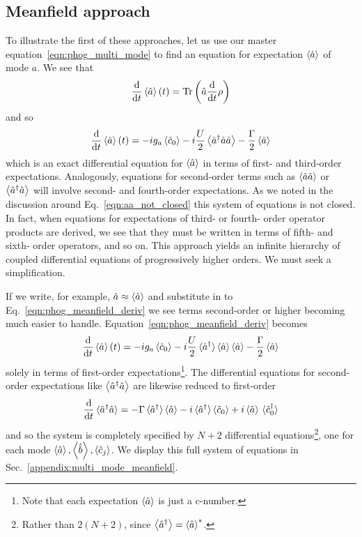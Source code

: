 \subsection{Meanfield approach}\label{sec:meanfield}
To illustrate the first of these approaches, let us use our master equation~\ref{eqn:phog_multi_mode} to find an equation for expectation $\ev{\hat{a}}$ of mode $a$. We see that
\begin{equation}
\ddt \ev{\hat{a}}\left(t\right) = \text{Tr}\left( \hat{a} \ddt \rho\right)
\end{equation}
and so
\begin{equation}\label{eqn:phog_meanfield_deriv}
\ddt \ev{\hat{a}}\left(t\right) = - i g_a \ev{\hat{c}_0} - i \frac{U}{2} \ev{\hat{a}^\dagger \hat{a}\hat{a}} - \frac{\Gamma}{2} \ev{\hat{a}}
\end{equation}
which is an exact differential equation for $\ev{\hat{a}}$ in terms of first- and third-order expectations. Analogously, equations for second-order terms such as $\ev{\hat{a}\hat{a}}$ or $\ev{\hat{a}^\dagger \hat{a}}$ will involve second- and fourth-order expectations. As we noted in the discussion around Eq.~\ref{eqn:aa_not_closed} this system of equations is not closed. In fact, when equations for expectations of third- or fourth- order operator products are derived, we see that they must be written in terms of fifth- and sixth- order operators, and so on. This approach yields an infinite hierarchy of coupled differential equations of progressively higher orders. We must seek a simplification.

If we write, for example, $\hat{a} \approx \ev{\hat{a}}$ and substitute in to Eq.~\ref{eqn:phog_meanfield_deriv} we see terms second-order or higher becoming much easier to handle. Equation~\ref{eqn:phog_meanfield_deriv} becomes
\begin{equation}\label{eqn:phog_meanfield_deriv_1}
\ddt \ev{\hat{a}}\left(t\right) = - i g_a \ev{\hat{c}_0} - i \frac{U}{2} \ev*{\hat{a}^\dagger} \ev{\hat{a}} \ev{\hat{a}} - \frac{\Gamma}{2} \ev{\hat{a}}
\end{equation}
solely in terms of first-order expectations\footnote{Note that each expectation $\ev{\hat{a}}$ is just a c-number.}. The differential equations for second-order expectations like $\ev{\hat{a}^\dagger \hat{a}}$ are likewise reduced to first-order
\begin{equation}
\ddt \ev*{\hat{a}^\dagger \hat{a}} = - \Gamma \ev*{\hat{a}^\dagger}\ev{\hat{a}} - i \ev*{\hat{a}^\dagger}\ev{\hat{c}_0} + i \ev{\hat{a}}\ev*{\hat{c}_0^\dagger}
\end{equation}
and so the system is completely specified by $N+2$ differential equations\footnote{Rather than $2(N+2)$, since $\ev{\hat{a}^\dagger} = \ev{\hat{a}}^*$.}, one for each mode $\ev{\hat{a}}, \ev{\hat{b}}, \ev{\hat{c}_j}$. We display this full system of equations in Sec.~\ref{appendix:multi_mode_meanfield}. 


